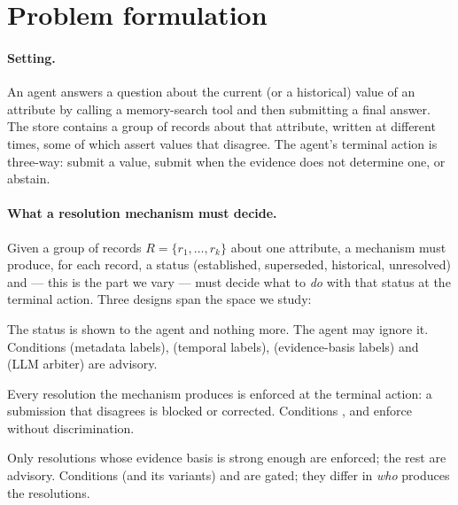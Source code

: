 \section{Problem formulation}
\label{sec:problem}

\paragraph{Setting.} An agent answers a question about the current (or a historical) value of an attribute by
calling a memory-search tool and then submitting a final answer. The store contains a group of records about that
attribute, written at different times, some of which assert values that disagree. The agent's terminal action is
three-way: submit a value, submit  when the evidence does not determine one, or abstain.

\paragraph{What a resolution mechanism must decide.} Given a group of records $R=\{r_1,\dots,r_k\}$ about one
attribute, a mechanism must produce, for each record, a status (established, superseded, historical, unresolved)
and --- this is the part we vary --- must decide what to \emph{do} with that status at the terminal action. Three
designs span the space we study:

\begin{description}[leftmargin=1.2em]
\item[Advisory.] The status is shown to the agent and nothing more. The agent may ignore it. Conditions
 (metadata labels),  (temporal labels),  (evidence-basis labels) and  (LLM
arbiter) are advisory.
\item[Ungated enforcement.] Every resolution the mechanism produces is enforced at the terminal action: a
submission that disagrees is blocked or corrected. Conditions ,  and  enforce
without discrimination.
\item[Gated enforcement.] Only resolutions whose evidence basis is strong enough are enforced; the rest are
advisory. Conditions  (and its variants) and  are gated; they differ in \emph{who} produces the
resolutions.
\end{description}

